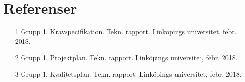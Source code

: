 \section{Referenser}
	\begin{itemize}
	\item [1] Grupp 1. Kravspecifikation. Tekn. rapport. Linköpings universitet, febr. 2018.
	\item [2] Grupp 1. Projektplan. Tekn. rapport. Linköpings universitet, febr. 2018.
	\item [3] Grupp 1. Kvalitetsplan. Tekn. rapport. Linköpings universitet, febr. 2018.
	\end{itemize}



